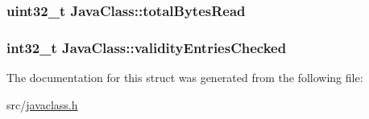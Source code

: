 \subsubsection[{\texorpdfstring{total\+Bytes\+Read}{totalBytesRead}}]{\setlength{\rightskip}{0pt plus 5cm}uint32\+\_\+t Java\+Class\+::total\+Bytes\+Read}\hypertarget{structJavaClass_a58b471dbb758d2a3c1bbd6e0e90fb6e2}{}\label{structJavaClass_a58b471dbb758d2a3c1bbd6e0e90fb6e2}
\subsubsection[{\texorpdfstring{validity\+Entries\+Checked}{validityEntriesChecked}}]{\setlength{\rightskip}{0pt plus 5cm}int32\+\_\+t Java\+Class\+::validity\+Entries\+Checked}\hypertarget{structJavaClass_a60729716eb3da22f5517b877343be076}{}\label{structJavaClass_a60729716eb3da22f5517b877343be076}


The documentation for this struct was generated from the following file\+:\begin{DoxyCompactItemize}
\item 
src/\hyperlink{javaclass_8h}{javaclass.\+h}\end{DoxyCompactItemize}
